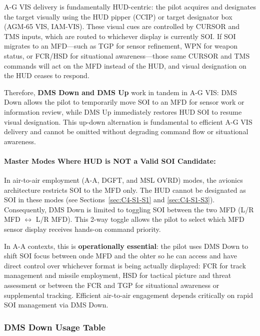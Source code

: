 \documentclass[11pt,a4paper]{article}
\begin{document}
A-G VIS delivery is fundamentally HUD-centric: the pilot acquires and designates the target 
visually using the HUD pipper (CCIP) or target designator box (AGM-65 VIS, IAM-VIS). These 
visual cues are controlled by CURSOR and TMS inputs, which are routed to whichever display 
is currently SOI. If SOI migrates to an MFD---such as TGP for sensor refinement, WPN for 
weapon status, or FCR/HSD for situational awareness---those same CURSOR and TMS commands 
will act on the MFD instead of the HUD, and visual designation on the HUD ceases to respond.

Therefore, \textbf{DMS Down and DMS Up} work in tandem in A-G VIS: DMS Down allows the pilot to 
temporarily move SOI to an MFD for sensor work or information review, while DMS Up 
immediately restores HUD SOI to resume visual designation. This up-down alternation is 
fundamental to efficient A-G VIS delivery and cannot be omitted without degrading command 
flow or situational awareness.

\paragraph{Master Modes Where HUD is NOT a Valid SOI Candidate:}

In air-to-air employment (A-A, DGFT, and MSL OVRD) modes, the avionics architecture 
restricts SOI to the MFD only. The HUD cannot be designated as SOI 
in these modes (see Sections~\ref{sec:C4-S1-S1} and \ref{sec:C4-S1-S3}). 
Consequently, DMS Down is limited to toggling SOI between the two MFD (L/R MFD 
$\leftrightarrow$ L/R MFD). This 2-way toggle allows the pilot to select which MFD sensor 
display receives hands-on command priority.

In A-A contexts, this is \textbf{operationally essential}: the pilot uses DMS Down to shift SOI focus between onde MFD and the ohter so he can access and have direct control over whichever format is being actually displayed: FCR for track management 
and missile employment, HSD for tactical picture and threat assessment or between 
the FCR and TGP for situational awareness or supplemental tracking. Efficient air-to-air engagement depends critically on rapid SOI management via 
DMS Down.


\subsubsection{DMS Down Usage Table}
\label{sec:C4-S3-S2}
\end{document}
